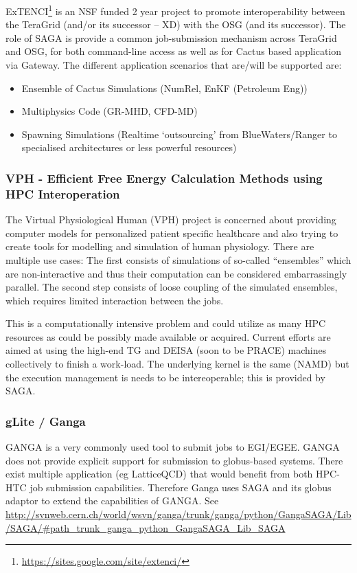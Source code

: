 \documentclass[12pt]{article}
\begin{document}
 ExTENCI\footnote{\url{https://sites.google.com/site/extenci/}} is an
 NSF funded 2 year project to promote interoperability between the
 TeraGrid (and/or its successor -- XD) with the OSG (and its
 successor).  The role of SAGA is provide a common job-submission
 mechanism across TeraGrid and OSG, for both command-line access as
 well as for Cactus based application via Gateway.  The different
 application scenarios that are/will be supported are:
 
 \begin{itemize}
 \item Ensemble of Cactus Simulations (NumRel, EnKF (Petroleum Eng))
 \item Multiphysics Code (GR-MHD, CFD-MD)
 \item Spawning Simulations (Realtime ‘outsourcing’ from
   BlueWaters/Ranger to specialised architectures or less powerful
   resources)
 \end{itemize}


\subsubsection*{VPH - Efficient Free Energy Calculation Methods using
  HPC Interoperation}

The Virtual Physiological Human (VPH) project is concerned about
providing computer models for personalized patient specific healthcare
and also trying to create tools for modelling and simulation of human
physiology. There are multiple use cases: The first consists of
simulations of so-called “ensembles” which are non-interactive and
thus their computation can be considered embarrassingly parallel. The
second step consists of loose coupling of the simulated ensembles,
which requires limited interaction between the jobs.

This is a computationally intensive problem and could utilize as many
HPC resources as could be possibly made available or acquired. Current
efforts are aimed at using the high-end TG and DEISA (soon to be
PRACE) machines collectively to finish a work-load. The underlying
kernel is the same (NAMD) but the execution management is needs
to be intereoperable; this is provided by SAGA.

\subsubsection*{gLite / Ganga} 

GANGA is a very commonly used tool to submit jobs to EGI/EGEE. GANGA
does not provide explicit support for submission to globus-based
systems. There exist multiple application (eg LatticeQCD) that would
benefit from both HPC-HTC job submission capabilities. Therefore Ganga
uses SAGA and its globus adaptor to extend the capabilities of GANGA.
See
\url{http://svnweb.cern.ch/world/wsvn/ganga/trunk/ganga/python/GangaSAGA/Lib/SAGA/#path_trunk_ganga_python_GangaSAGA_Lib_SAGA}
\end{document}
